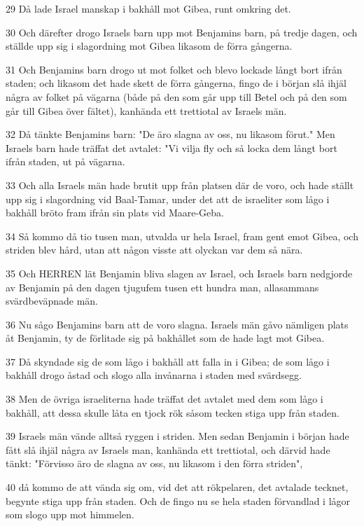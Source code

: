 \par 29 Då lade Israel manskap i bakhåll mot Gibea, runt omkring det.
\par 30 Och därefter drogo Israels barn upp mot Benjamins barn, på tredje dagen, och ställde upp sig i slagordning mot Gibea likasom de förra gångerna.
\par 31 Och Benjamins barn drogo ut mot folket och blevo lockade långt bort ifrån staden; och likasom det hade skett de förra gångerna, fingo de i början slå ihjäl några av folket på vägarna (både på den som går upp till Betel och på den som går till Gibea över fältet), kanhända ett trettiotal av Israels män.
\par 32 Då tänkte Benjamins barn: "De äro slagna av oss, nu likasom förut." Men Israels barn hade träffat det avtalet: "Vi vilja fly och så locka dem långt bort ifrån staden, ut på vägarna.
\par 33 Och alla Israels män hade brutit upp från platsen där de voro, och hade ställt upp sig i slagordning vid Baal-Tamar, under det att de israeliter som lågo i bakhåll bröto fram ifrån sin plats vid Maare-Geba.
\par 34 Så kommo då tio tusen man, utvalda ur hela Israel, fram gent emot Gibea, och striden blev hård, utan att någon visste att olyckan var dem så nära.
\par 35 Och HERREN lät Benjamin bliva slagen av Israel, och Israels barn nedgjorde av Benjamin på den dagen tjugufem tusen ett hundra man, allasammans svärdbeväpnade män.
\par 36 Nu sågo Benjamins barn att de voro slagna. Israels män gåvo nämligen plats åt Benjamin, ty de förlitade sig på bakhållet som de hade lagt mot Gibea.
\par 37 Då skyndade sig de som lågo i bakhåll att falla in i Gibea; de som lågo i bakhåll drogo åstad och slogo alla invånarna i staden med svärdsegg.
\par 38 Men de övriga israeliterna hade träffat det avtalet med dem som lågo i bakhåll, att dessa skulle låta en tjock rök såsom tecken stiga upp från staden.
\par 39 Israels män vände alltså ryggen i striden. Men sedan Benjamin i början hade fått slå ihjäl några av Israels man, kanhända ett trettiotal, och därvid hade tänkt: "Förvisso äro de slagna av oss, nu likasom i den förra striden",
\par 40 då kommo de att vända sig om, vid det att rökpelaren, det avtalade tecknet, begynte stiga upp från staden. Och de fingo nu se hela staden förvandlad i lågor som slogo upp mot himmelen.
